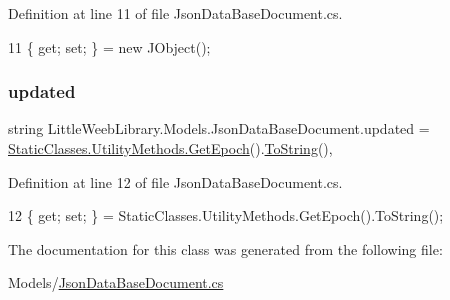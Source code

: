 Definition at line 11 of file Json\+Data\+Base\+Document.\+cs.


\begin{DoxyCode}
11 \{ \textcolor{keyword}{get}; \textcolor{keyword}{set}; \} = \textcolor{keyword}{new} JObject();
\end{DoxyCode}
\mbox{\label{class_little_weeb_library_1_1_models_1_1_json_data_base_document_a42925c25aecabb526e6dbb3172d94efb}} 
\subsubsection{\texorpdfstring{updated}{updated}}
{\footnotesize\ttfamily string Little\+Weeb\+Library.\+Models.\+Json\+Data\+Base\+Document.\+updated = \mbox{\hyperlink{class_little_weeb_library_1_1_static_classes_1_1_utility_methods_a12336d9e64983ddabaad8950486fafb2}{Static\+Classes.\+Utility\+Methods.\+Get\+Epoch}}().\mbox{\hyperlink{class_little_weeb_library_1_1_models_1_1_json_data_base_document_a0a84a997c39ac76d99382cdabf9227bf}{To\+String}}()\hspace{0.3cm}{\ttfamily [get]}, {\ttfamily [set]}}



Definition at line 12 of file Json\+Data\+Base\+Document.\+cs.


\begin{DoxyCode}
12 \{ \textcolor{keyword}{get}; \textcolor{keyword}{set}; \} = StaticClasses.UtilityMethods.GetEpoch().ToString();
\end{DoxyCode}


The documentation for this class was generated from the following file\+:\begin{DoxyCompactItemize}
\item 
Models/\mbox{\hyperlink{_json_data_base_document_8cs}{Json\+Data\+Base\+Document.\+cs}}\end{DoxyCompactItemize}
